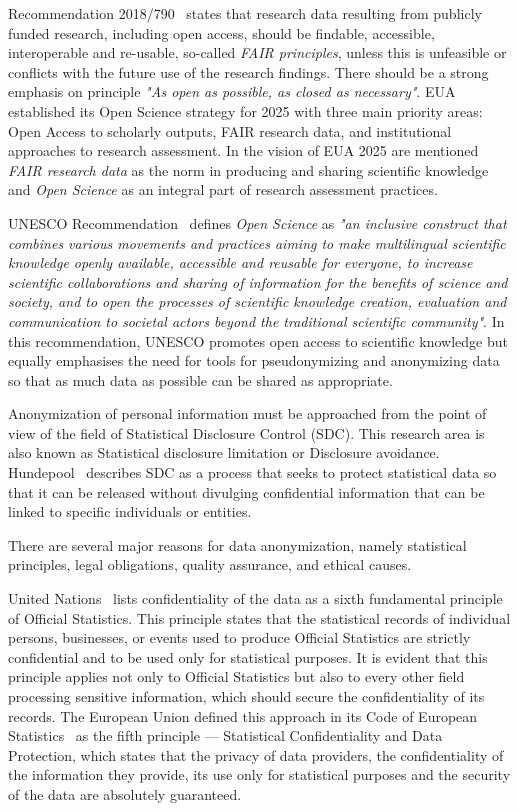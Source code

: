 \documentclass{article}
\begin{document}
Recommendation 2018/790~\cite{2018_EU_2018/790} states that research data resulting from publicly funded research, including open access, should be findable, accessible, interoperable and re-usable, so-called \textit{FAIR principles}, unless this is unfeasible or conflicts with the future use of the research findings. There should be a strong emphasis on principle \textit{"As open as possible, as closed as necessary"}. 
EUA~\cite{2022_EUA} established its Open Science strategy for 2025 with three main priority areas: Open Access to scholarly outputs, FAIR research data, and institutional approaches to research assessment. In the vision of EUA 2025 are mentioned \textit{FAIR research data} as the norm in producing and sharing scientific knowledge and \textit{Open Science} as an integral part of research assessment practices.

UNESCO Recommendation~\cite{2021_UNESCO} defines \textit{Open Science} as \textit{"an
inclusive construct that combines various movements and practices aiming
to make multilingual scientific knowledge openly available, accessible and
reusable for everyone, to increase scientific collaborations and sharing of
information for the benefits of science and society, and to open the processes of scientific knowledge creation, evaluation and communication to societal actors beyond the traditional scientific community"}. In this recommendation, UNESCO promotes open access to scientific knowledge but equally emphasises the need for tools for pseudonymizing and anonymizing data so that as much data as possible can be shared as appropriate.
\newline

Anonymization of personal information must be approached from the point of view 
of the field of Statistical Disclosure Control (SDC). This research area is also known as Statistical disclosure limitation or Disclosure avoidance.
Hundepool~\cite{2012_Hundepool} describes SDC as a process that seeks to protect statistical data so that it can be released without divulging confidential information that can be linked to specific individuals or entities.

There are several major reasons for data anonymization, namely statistical principles, legal obligations, quality assurance, and ethical causes. 

United Nations~\cite{2015_UN} lists confidentiality of the data as a sixth fundamental principle of Official Statistics. This principle states that the statistical records of individual persons, businesses, or events used to produce Official Statistics are strictly confidential and to be used only for statistical purposes. It is evident that this principle applies not only to Official Statistics but also to every other field processing sensitive information, which should secure the confidentiality of its records. The European Union defined this approach in its Code of European Statistics~\cite{2018_Eurostat} as the fifth principle — Statistical Confidentiality and Data Protection, which states that the privacy of data providers, the confidentiality of the information they provide, its use only for statistical purposes and the security of the data are absolutely guaranteed.
\end{document}
